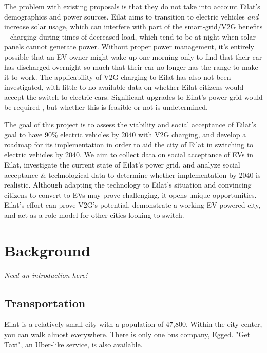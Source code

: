 \documentclass{report}                         %
\begin{document}
The problem with existing proposals is that they do not take into account Eilat's demographics and power sources. Eilat aims to transition to electric vehicles \textit{and} increase solar usage, which can interfere with part of the smart-grid/V2G benefits -- charging during times of decreased load, which tend to be at night when solar panels cannot generate power. Without proper power management, it's entirely possible that an EV owner might wake up one morning only to find that their car has discharged overnight so much that their car no longer has the range to make it to work. The applicability of V2G charging to Eilat has also not been investigated, with little to no available data on whether Eilat citizens would accept the switch to electric cars. Significant upgrades to Eilat's power grid would be required \cite{Vardimon2011AssessmentIsrael}, but whether this is feasible or not is undetermined. 

The goal of this project is to assess the viability and social acceptance of Eilat's goal to have 90\% electric vehicles by 2040 with V2G charging, and develop a roadmap for its implementation in order to aid the city of Eilat in switching to electric vehicles by 2040. We aim to collect data on social acceptance of EVs in Eilat, investigate the current state of Eilat's power grid, and analyze social acceptance \& technological data to determine whether implementation by 2040 is realistic. Although adapting the technology to Eilat's situation and convincing citizens to convert to EVs may prove challenging, it opens unique opportunities. Eilat's effort can prove V2G's potential, demonstrate a working EV-powered city, and act as a role model for other cities looking to switch.

\newpage
\chapter{Background}
\textit{Need an introduction here!}

\section{Transportation}
Eilat is a relatively small city with a population of 47,800. Within the city center, you can walk almost everywhere. There is only one bus company, Egged. \cite{TransportationEilat} "Get Taxi", an Uber-like service, is also available. 
\end{document}
